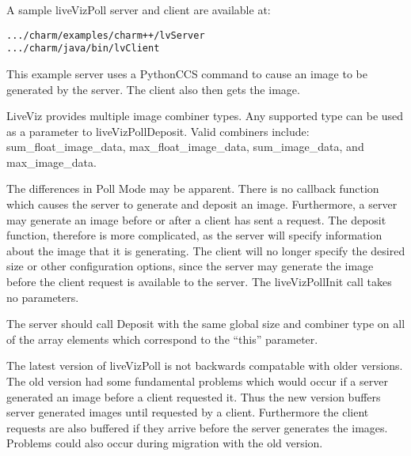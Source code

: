 A sample liveVizPoll server and client are available at:
\begin{alltt}
           .../charm/examples/charm++/lvServer
           .../charm/java/bin/lvClient
\end{alltt}
This example server uses a PythonCCS command to cause an image to be generated by the server. The client also then gets the image.

LiveViz provides multiple image combiner types. Any supported type can be used as a parameter to liveVizPollDeposit. Valid combiners include: sum\_float\_image\_data, max\_float\_image\_data, sum\_image\_data, and max\_image\_data. 

The differences in Poll Mode may be apparent. There is no callback function which causes the server to generate and deposit an image. Furthermore, a server may generate an image before or after a client has sent a request. The deposit function, therefore is more complicated, as the server will specify information about the image that it is generating. The client will no longer specify the desired size or other configuration options, since the server may generate the image before the client request is available to the server. The liveVizPollInit call takes no parameters.

The server should call Deposit with the same global size and combiner type on all of the array elements which correspond to the ``this'' parameter.

The latest version of liveVizPoll is not backwards compatable with older versions. The old version had some fundamental problems which would occur if a server generated an image before a client requested it. Thus the new version buffers server generated images until requested by a client. Furthermore the client requests are also buffered if they arrive before the server generates the images. Problems could also occur during migration with the old version.

